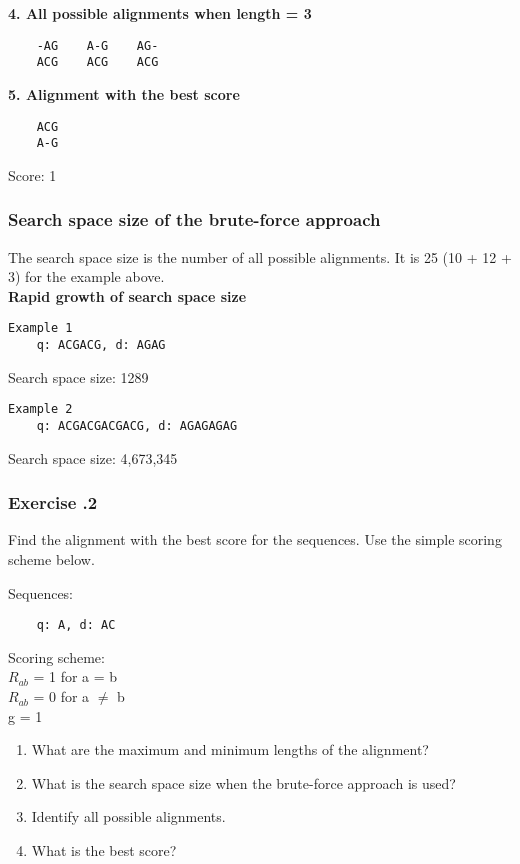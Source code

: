 \noindent \textbf{4. All possible alignments when length = 3}
\begin{verbatim}
    -AG    A-G    AG-
    ACG    ACG    ACG
\end{verbatim}
\medskip

\noindent \textbf{5. Alignment with the best score}
\begin{verbatim}
    ACG
    A-G	
\end{verbatim}

Score: 1

%
%
\subsubsection*{Search space size of the brute-force approach}
The search space size is the number of all possible alignments. It is 25 (10 + 12 + 3) for the example above. \\

\noindent \textbf{Rapid growth of search space size}

\begin{multicols}{2}
\begin{verbatim}
Example 1
    q: ACGACG, d: AGAG
\end{verbatim}
Search space size: 1289

\begin{verbatim}
Example 2
    q: ACGACGACGACG, d: AGAGAGAG
\end{verbatim}
Search space size: 4,673,345

\end{multicols}

%
%
\subsubsection*{Exercise \thesection.2}
Find the alignment with the best score for the sequences.  Use the simple scoring scheme below.

\begin{multicols}{2}
Sequences:
\begin{verbatim}
    q: A, d: AC
\end{verbatim}
\vfill\null
\columnbreak

\noindent Scoring scheme: \\ 
\null \quad $R_{ab}$ = 1 for a = b \\ 
\null \quad $R_{ab}$ = 0 for a $\neq$ b \\ 
\null \quad g = 1

\end{multicols} 

\begin{enumerate}
\item What are the maximum and minimum lengths of the alignment?
\item What is the search space size when the brute-force approach is used?
\item Identify all possible alignments.
\item What is the best score?
\end{enumerate}

%
